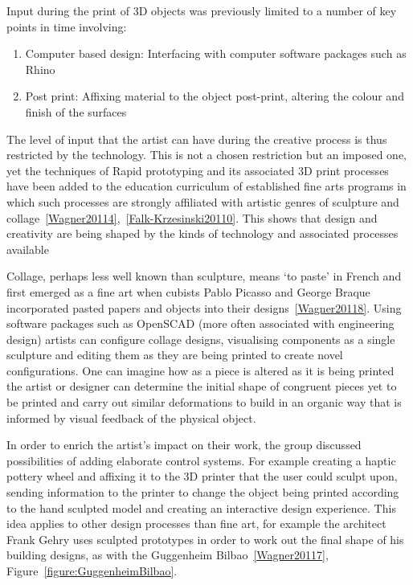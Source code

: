 \documentclass[11pt]{report} %
\begin{document}
	Input during the print of 3D objects was previously limited to a number of key points in time involving: 
\begin{enumerate}
\item Computer based design: Interfacing with computer software packages such as Rhino
\item Post print: Affixing material to the object post-print, altering the colour and finish of the surfaces
\end{enumerate}

	The level of input that the artist can have during the creative process is thus restricted by the technology. This is not a chosen restriction but an imposed one, yet the techniques of Rapid prototyping and its associated 3D print processes have been added to the education curriculum of established fine arts programs in which such processes are strongly affiliated with artistic genres of sculpture and collage~\ref{Wagner20114},~\ref{Falk-Krzesinski20110}. This shows that design and creativity are being shaped by the kinds of technology and associated processes available 

	Collage, perhaps less well known than sculpture, means `to paste' in French and first emerged as a fine art when cubists Pablo Picasso and George Braque incorporated pasted papers and objects into their designs~\ref{Wagner20118}. Using software packages such as OpenSCAD (more often associated with engineering design) artists can configure collage designs, visualising components as a single sculpture and editing them as they are being printed to create novel configurations. One can imagine how as a piece is altered as it is being printed the artist or designer can determine the initial shape of congruent pieces yet to be printed and carry out similar deformations to build in an organic way that is informed by visual feedback of the physical object.

	In order to enrich the artist's impact on their work, the group discussed possibilities of adding elaborate control systems. For example creating a haptic pottery wheel and affixing it to the 3D printer that the user could sculpt upon, sending information to the printer to change the object being printed according to the hand sculpted model and creating an interactive design experience. This idea applies to other design processes than fine art, for example the architect Frank Gehry uses sculpted prototypes in order to work out the final shape of his building designs, as with the Guggenheim Bilbao~\ref{Wagner20117}, Figure~\ref{figure:GuggenheimBilbao}.
\end{document}
